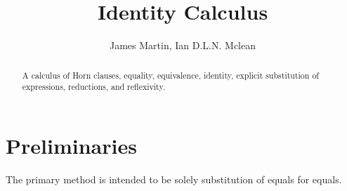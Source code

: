 \documentclass{article}
\author{James Martin, Ian D.L.N. Mclean}
\title{Identity Calculus}
\begin{document}
\maketitle

\begin{abstract}
A calculus of Horn clauses, equality, equivalence, identity, explicit substitution of expressions, reductions, and reflexivity.
\end{abstract}

\part{Preliminaries}
\begin{center}
	\begin{flushleft}
		The primary method is intended to be solely substitution of equals for equals.
	\end{flushleft}

	
\end{center}

\newpage
\end{document}
